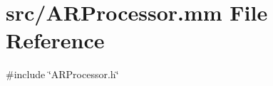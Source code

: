 \hypertarget{_a_r_processor_8mm}{}\section{src/\+A\+R\+Processor.mm File Reference}
\label{_a_r_processor_8mm}
{\ttfamily \#include \char`\"{}A\+R\+Processor.\+h\char`\"{}}\newline
